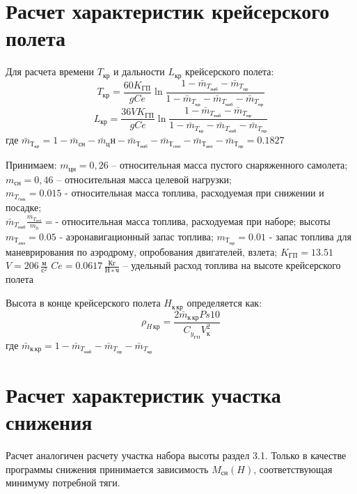 \section{Расчет характеристик крейсерского полета}

Для расчета времени $T_{кр}$ и дальности $L_{кр}$ крейсерского полета:
\begin{equation}
T_{кр} = \frac{60 K_{ГП}}{gCe} \ln{\frac{1 - \bar{m}_{T_{наб}} - \bar{m}_{T_{пр}}}{1 - \bar{m}_{T_{кр}}-\bar{m}_{T_{наб}}-\bar{m}_{T_{пр}}}}
\end{equation}
\begin{equation}
L_{кр} = \frac{36 V K_{ГП}}{gCe} \ln{\frac{1 - \bar{m}_{T_{наб}} - \bar{m}_{T_{пр}}}{1 - \bar{m}_{T_{кр}}-\bar{m}_{T_{наб}}-\bar{m}_{T_{пр}}}}
\end{equation}
где $\bar{m}_{Т_{кр}} = 1 - \bar{m}_{сн} - \bar{m}_цн - \bar{m}_{Т_{наб}} -
\bar{m}_{Т_{снп}} - \bar{m}_{Т_{анз}} - \bar{m}_{Т_{пр}} = 0.1827$ 

Принимаем:
$m_{цн} = 0,26$ – относительная масса пустого снаряженного самолета;\\
$m_{сн} =0,46$ – относительная масса целевой нагрузки;\\
$m_{T_{cнп}} =0.015$ - относительная масса топлива, расходуемая при снижении и
посадке;\\
$\bar{m}_{T_{наб}} \frac{m_{T_{наб}}}{m_0} = $- относительная масса топлива, расходуемая при наборе;
высоты\\
$m_{Т_{анз}} = 0.05$ - аэронавигационный запас топлива;
$m_{Т_{пр}} = 0.01$ - запас топлива для маневрирования по аэродрому, опробования
двигателей, взлета;
$K_{ГП} = 13.51$
$V = 206\, \frac{м}{с^2}$
$Ce= 0.0617\, \frac{Кг}{Н∗ч} $ – удельный расход топлива на высоте крейсерского
полета

Высота в конце крейсерского полета $H_{к\, кр}$ определяется как:
\begin{equation}
    \rho_{H\, {кр}} = \frac{2 \bar{m}_{к\, кр} Ps 10 }{C_{y_{ГП}} V_к^2}
\end{equation}
где $\bar{m}_{к\, кр} = 1 - \bar{m}_{T_{наб}} - \bar{m}_{T_{пр}} - \bar{m}_{T_{кр}}$



\section{Расчет характеристик участка снижения}
Расчет аналогичен расчету участка набора высоты раздел 3.1.
Только в качестве программы снижения принимается зависимость $M_{сн}(H)$,
соответствующая минимуму потребной тяги.

